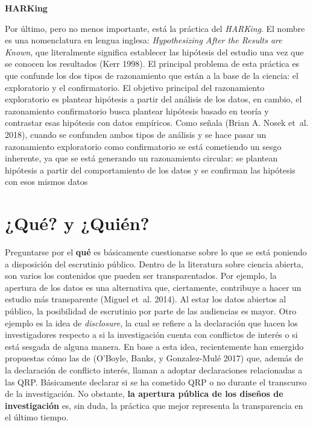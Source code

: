 \documentclass[
  spanish,
  letterpaper,
  DIV=11,
  numbers=noendperiod]{scrreprt}
\begin{document}
\textbf{HARKing}

Por último, pero no menos importante, está la práctica del
\emph{HARKing}. El nombre es una nomenclatura en lengua inglesa:
\emph{Hypothesizing After the Results are Known}, que literalmente
significa establecer las hipótesis del estudio una vez que se conocen
los resultados (Kerr 1998). El principal problema de esta práctica es
que confunde los dos tipos de razonamiento que están a la base de la
ciencia: el exploratorio y el confirmatorio. El objetivo principal del
razonamiento exploratorio es plantear hipótesis a partir del análisis de
los datos, en cambio, el razonamiento confirmatorio busca plantear
hipótesis basado en teoría y contrastar esas hipótesis con datos
empíricos. Como señala (Brian A. Nosek et~al. 2018), cuando se confunden
ambos tipos de análisis y se hace pasar un razonamiento exploratorio
como confirmatorio se está cometiendo un sesgo inherente, ya que se está
generando un razonamiento circular: se plantean hipótesis a partir del
comportamiento de los datos y se confirman las hipótesis con esos mismos
datos

\section{¿Qué? y ¿Quién?}\label{quuxe9-y-quiuxe9n}

Preguntarse por el \textbf{qué} es básicamente cuestionarse sobre lo que
se está poniendo a disposición del escrutinio público. Dentro de la
literatura sobre ciencia abierta, son varios los contenidos que pueden
ser transparentados. Por ejemplo, la apertura de los datos es una
alternativa que, ciertamente, contribuye a hacer un estudio más
transparente (Miguel et~al. 2014). Al estar los datos abiertos al
público, la posibilidad de escrutinio por parte de las audiencias es
mayor. Otro ejemplo es la idea de \emph{disclosure}, la cual se refiere
a la declaración que hacen los investigadores respecto a si la
investigación cuenta con conflictos de interés o si está sesgada de
alguna manera. En base a esta idea, recientemente han emergido
propuestas cómo las de (O'Boyle, Banks, y Gonzalez-Mulé 2017) que,
además de la declaración de conflicto interés, llaman a adoptar
declaraciones relacionadas a las QRP. Básicamente declarar si se ha
cometido QRP o no durante el transcurso de la investigación. No
obstante, \textbf{la apertura pública de los diseños de investigación}
es, sin duda, la práctica que mejor representa la transparencia en el
último tiempo.
\end{document}
